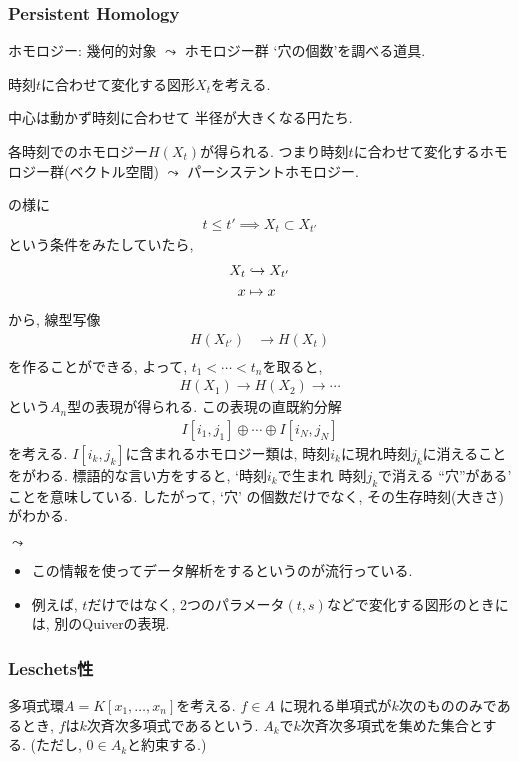 \subsubsection{Persistent Homology}
ホモロジー:
幾何的対象 $\leadsto$ ホモロジー群
\ZU
`穴の個数'を調べる道具.



時刻$t$に合わせて変化する図形$X_t$を考える.
\begin{example}
  \label{ex:fundex:ph}
\ZU
中心は動かず時刻に合わせて
半径が大きくなる円たち.
\end{example}

各時刻でのホモロジー$H(X_t)$が得られる.
つまり時刻$t$に合わせて変化するホモロジー群(ベクトル空間)
$\leadsto$ パーシステントホモロジー.

の様に
\begin{align*}
  t\leq t' \implies X_t \subset X_{t'}
\end{align*}
という条件をみたしていたら,
\begin{align*}
  X_t&\hookrightarrow X_{t'}\\
  x&\mapsto x
\end{align*}
から, 線型写像
\begin{align*}
  H(X_{t'})&\to H(X_t)\\
\end{align*}
を作ることができる,
よって,
$t_1<\cdots <t_n$を取ると,
\begin{align*}
  H(X_1)\to H(X_2)\to\cdots
\end{align*}
という$A_n$型の表現が得られる.
この表現の直既約分解
\begin{align*}
  I[i_1,j_1]\oplus \cdots\oplus I[i_N,j_N]
\end{align*}
を考える.
$I[i_k,j_k]$に含まれるホモロジー類は,
時刻$i_k$に現れ時刻$j_k$に消えることをがわる.
標語的な言い方をすると,
`時刻$i_k$で生まれ
時刻$j_k$で消える
``穴''がある'
ことを意味している.
したがって,
`穴' の個数だけでなく,
その生存時刻(大きさ)がわかる.

$\leadsto$
\begin{itemize}
\item
  この情報を使ってデータ解析をするというのが流行っている.
\item
  例えば, $t$だけではなく,
  2つのパラメータ$(t,s)$などで変化する図形のときには,
  別のQuiverの表現.
\end{itemize}


\subsubsection{Leschets性}
多項式環$A=K[x_1,\ldots,x_n]$を考える.
$f\in A$ 
に現れる単項式が$k$次のもののみであるとき,
$f$は$k$次斉次多項式であるという.
$A_k$で$k$次斉次多項式を集めた集合とする.
(ただし, $0\in A_k$と約束する.)

